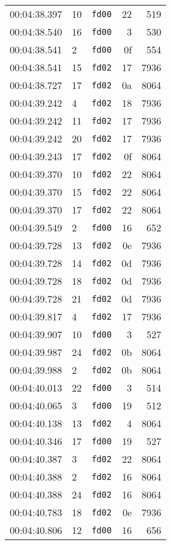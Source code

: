 \documentclass{article}
\begin{document}
\begin{longtable}{lllrr}
00:04:38.397 & 10 & \texttt{fd00} & 22 & 519 \\
00:04:38.540 & 16 & \texttt{fd00} & 3 & 530 \\
00:04:38.541 & 2 & \texttt{fd00} & 0f & 554 \\
00:04:38.541 & 15 & \texttt{fd02} & 17 & 7936 \\
00:04:38.727 & 17 & \texttt{fd02} & 0a & 8064 \\
00:04:39.242 & 4 & \texttt{fd02} & 18 & 7936 \\
00:04:39.242 & 11 & \texttt{fd02} & 17 & 7936 \\
00:04:39.242 & 20 & \texttt{fd02} & 17 & 7936 \\
00:04:39.243 & 17 & \texttt{fd02} & 0f & 8064 \\
00:04:39.370 & 10 & \texttt{fd02} & 22 & 8064 \\
00:04:39.370 & 15 & \texttt{fd02} & 22 & 8064 \\
00:04:39.370 & 17 & \texttt{fd02} & 22 & 8064 \\
00:04:39.549 & 2 & \texttt{fd00} & 16 & 652 \\
00:04:39.728 & 13 & \texttt{fd02} & 0e & 7936 \\
00:04:39.728 & 14 & \texttt{fd02} & 0d & 7936 \\
00:04:39.728 & 18 & \texttt{fd02} & 0d & 7936 \\
00:04:39.728 & 21 & \texttt{fd02} & 0d & 7936 \\
00:04:39.817 & 4 & \texttt{fd02} & 17 & 7936 \\
00:04:39.907 & 10 & \texttt{fd00} & 3 & 527 \\
00:04:39.987 & 24 & \texttt{fd02} & 0b & 8064 \\
00:04:39.988 & 2 & \texttt{fd02} & 0b & 8064 \\
00:04:40.013 & 22 & \texttt{fd00} & 3 & 514 \\
00:04:40.065 & 3 & \texttt{fd00} & 19 & 512 \\
00:04:40.138 & 13 & \texttt{fd02} & 4 & 8064 \\
00:04:40.346 & 17 & \texttt{fd00} & 19 & 527 \\
00:04:40.387 & 3 & \texttt{fd02} & 22 & 8064 \\
00:04:40.388 & 2 & \texttt{fd02} & 16 & 8064 \\
00:04:40.388 & 24 & \texttt{fd02} & 16 & 8064 \\
00:04:40.783 & 18 & \texttt{fd02} & 0e & 7936 \\
00:04:40.806 & 12 & \texttt{fd00} & 16 & 656 \\

\end{longtable}
\end{document}
